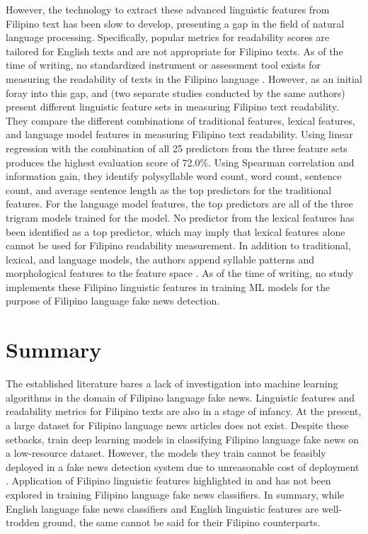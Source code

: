 However, the technology to extract these advanced linguistic features from Filipino text has been slow to develop, presenting a gap in the field of natural language processing. Specifically, popular metrics for readability scores are tailored for English texts and are not appropriate for Filipino texts. As of the time of writing, no standardized instrument or assessment tool exists for measuring the readability of texts in the Filipino language \cite{imperial-2020}. However, as an initial foray into this gap,  and  (two separate studies conducted by the same authors) present different linguistic feature sets in measuring Filipino text readability. They compare the different combinations of traditional features, lexical features, and language model features in measuring Filipino text readability. Using linear regression with the combination of all 25 predictors from the three feature sets produces the highest evaluation score of 72.0\%. Using Spearman correlation and information gain, they identify polysyllable word count, word count, sentence count, and average sentence length as the top predictors for the traditional features. For the language model features, the top predictors are all of the three trigram models trained for the model. No predictor from the lexical features has been identified as a top predictor, which may imply that lexical features alone cannot be used for Filipino readability measurement. In addition to traditional, lexical, and language models, the authors append syllable patterns and morphological features to the feature space \cite{imperial-2021, imperial-2020}. As of the time of writing, no study implements these Filipino linguistic features in training ML models for the purpose of Filipino language fake news detection.

\section{Summary}

The established literature bares a lack of investigation into machine learning algorithms in the domain of Filipino language fake news. Linguistic features and readability metrics for Filipino texts are also in a stage of infancy. At the present, a large dataset for Filipino language news articles does not exist. Despite these setbacks,  train deep learning models in classifying Filipino language fake news on a low-resource dataset. However, the models they train cannot be feasibly deployed in a fake news detection system due to unreasonable cost of deployment \cite{paleyes-2022}. Application of Filipino linguistic features highlighted in  and  has not been explored in training Filipino language fake news classifiers. In summary, while English language fake news classifiers and English linguistic features are well-trodden ground, the same cannot be said for their Filipino counterparts.

\begin{comment}
\end{comment}